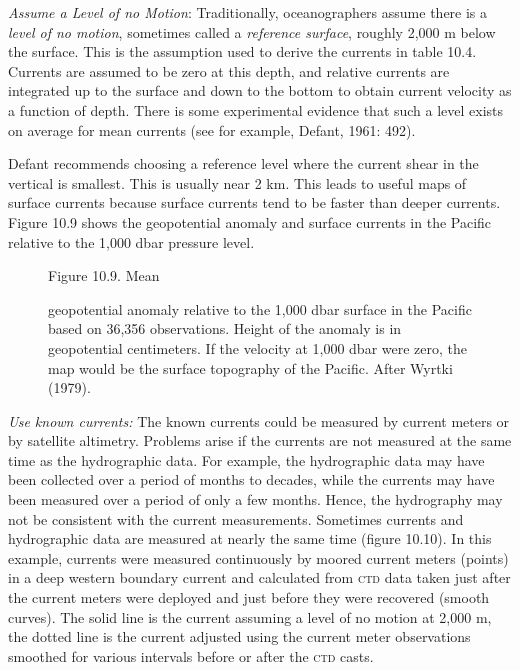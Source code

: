\begin{enumerate}
\vitem \textit{Assume a Level of no Motion}: Traditionally,
oceanographers assume there is a \textit{\textit{level of no motion}},
sometimes called a
\textit{\textit{reference surface}}, roughly 2,000 m below the
surface. This is the assumption used to derive the currents in table
10.4. Currents are assumed to be zero at this depth, and relative
currents are integrated up to the surface and down to the bottom to
obtain current velocity as a function of depth. There is some
experimental evidence that such a level exists on average for mean
currents (see for example, Defant, 1961: 492).

Defant recommends choosing a reference level where the current shear
in the vertical is smallest. This is usually near 2 km. This leads to
useful maps of surface currents because surface currents tend to be
faster than deeper currents. Figure 10.9 shows the geopotential
anomaly and surface currents in the Pacific relative to the 1,000 dbar
pressure level.

\begin{figure}[t!]
\footnotesize
Figure 10.9. Mean \rule{0mm}{4ex}geopotential anomaly relative to the
1,000 dbar surface in the Pacific based on 36,356 observations. Height
of the anomaly is in geopotential centimeters. If the velocity at
1,000 dbar were zero, the map would be the surface topography of the
Pacific. After Wyrtki (1979).
\label{fig:wyrtkiplot}
\vspace{-4ex}
\end{figure}

\vitem \textit{Use known currents:} The known currents could be
measured by current meters or by satellite altimetry. Problems arise
if the currents are not measured at the same time as the hydrographic
data. For example,
the hydrographic data may have been collected over a period of months
to decades, while the currents may have been measured over a period of
only a few months.  Hence, the hydrography may not be consistent with
the current measurements.  Sometimes currents and hydrographic data
are measured at nearly the same time (figure 10.10). In this example,
currents were measured continuously by moored current meters (points)
in a deep western boundary current and calculated from
\textsc{ctd} data taken just after the current meters were
deployed and just before they were recovered (smooth curves). The
solid line is the current assuming a level of no motion at 2,000 m,
the dotted line is the current adjusted using the current meter
observations smoothed for various intervals before or after the
\textsc{ctd} casts.


\end{enumerate}
